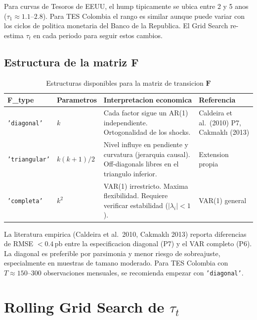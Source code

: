\documentclass[12pt, a4paper]{article}
\theoremstyle{plain}
\theoremstyle{definition}
\theoremstyle{remark}
\newcommand{\bF}{\mathbf{F}}
\begin{document}
Para curvas de Tesoros de EEUU, el hump tipicamente se ubica entre 2 y 5 anos
($\tau_1 \approx 1.1$--$2.8$). Para TES Colombia el rango es similar aunque
puede variar con los ciclos de politica monetaria del Banco de la Republica.
El Grid Search re-estima $\tau_t$ en cada periodo para seguir estos cambios.

\subsection{Estructura de la matriz $\bF$}

\begin{table}[H]
\centering
\caption{Estructuras disponibles para la matriz de transicion $\bF$}
\label{tab:F}
\small
\begin{tabular}{L{2.2cm} C{1.8cm} L{5.5cm} L{3.5cm}}
\toprule
\textbf{F\_type}
  & \textbf{Parametros}
  & \textbf{Interpretacion economica}
  & \textbf{Referencia} \\
\midrule
\texttt{'diagonal'}
  & $k$
  & Cada factor sigue un AR(1) independiente. Ortogonalidad de los shocks.
  & Caldeira et al.\ (2010) P7, Cakmaklı (2013) \\
\addlinespace
\texttt{'triangular'}
  & $k(k+1)/2$
  & Nivel influye en pendiente y curvatura (jerarquia causal). Off-diagonals libres en el triangulo inferior.
  & Extension propia \\
\addlinespace
\texttt{'completa'}
  & $k^2$
  & VAR(1) irrestricto. Maxima flexibilidad. Requiere verificar estabilidad ($|\lambda_i| < 1$).
  & VAR(1) general \\
\bottomrule
\end{tabular}
\end{table}

\begin{tipbox}
La literatura empirica (Caldeira et al.\ 2010, Cakmaklı 2013) reporta
diferencias de RMSE $< 0.4\,\text{pb}$ entre la especificacion diagonal (P7)
y el VAR completo (P6). La diagonal es preferible por parsimonia y menor
riesgo de sobreajuste, especialmente en muestras de tamano moderado.
Para TES Colombia con $T \approx 150$--$300$ observaciones mensuales,
se recomienda empezar con \texttt{'diagonal'}.
\end{tipbox}

\section{Rolling Grid Search de $\tau_t$}
\label{sec:gridsearch}
\end{document}

